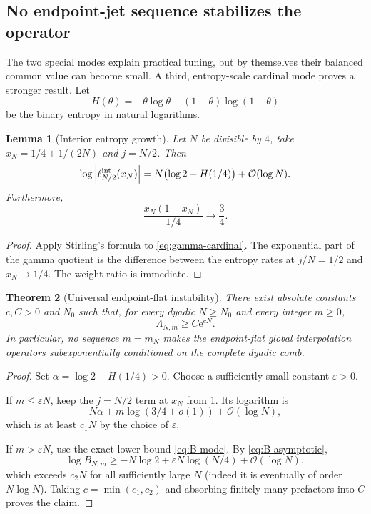 \documentclass[11pt,oneside]{article}
\numberwithin{equation}{section}
\newtheorem{theorem}{Theorem}[section]
\newtheorem{lemma}[theorem]{Lemma}
\theoremstyle{definition}
\theoremstyle{remark}
\newcommand{\e}{\mathrm e}
\newcommand{\bigO}{\mathcal O}
\newcommand{\Leb}{\Lambda}
\newcommand{\Hbin}{H}
\begin{document}
\subsection{No endpoint-jet sequence stabilizes the operator}

The two special modes explain practical tuning, but by themselves their balanced common
value can become small.  A third, entropy-scale cardinal mode proves a stronger result.
Let
\begin{equation}
 \Hbin(\theta)=-\theta\log\theta-(1-\theta)\log(1-\theta)
\end{equation}
be the binary entropy in natural logarithms.

\begin{lemma}[Interior entropy growth]
\label{lem:entropy-cardinal}
Let $N$ be divisible by $4$, take
$x_N=1/4+1/(2N)$ and $j=N/2$.  Then
\begin{equation}
 \log\left|\ell_{N/2}^{\rm int}(x_N)\right|
 =N\bigl(\log2-\Hbin(1/4)\bigr)+\bigO(\log N).
 \label{eq:entropy-growth}
\end{equation}
Furthermore,
\begin{equation}
 \frac{x_N(1-x_N)}{1/4}\longrightarrow\frac34.
 \label{eq:entropy-weight}
\end{equation}
\end{lemma}

\begin{proof}
Apply Stirling's formula to \eqref{eq:gamma-cardinal}.  The exponential part of the gamma
quotient is the difference between the entropy rates at $j/N=1/2$ and $x_N\to1/4$.
The weight ratio is immediate.
\end{proof}

\begin{theorem}[Universal endpoint-flat instability]
\label{thm:universal-instability}
There exist absolute constants $c,C>0$ and $N_0$ such that, for every dyadic
$N\ge N_0$ and every integer $m\ge0$,
\begin{equation}
 \Leb_{N,m}\ge C\e^{cN}.
 \label{eq:universal-instability}
\end{equation}
In particular, no sequence $m=m_N$ makes the endpoint-flat global interpolation operators
subexponentially conditioned on the complete dyadic comb.
\end{theorem}

\begin{proof}
Set $\alpha=\log2-\Hbin(1/4)>0$.  Choose a sufficiently small constant
$\varepsilon>0$.

If $m\le\varepsilon N$, keep the $j=N/2$ term at $x_N$ from
\cref{lem:entropy-cardinal}.  Its logarithm is
\[
 N\alpha+m\log(3/4+o(1))+\bigO(\log N),
\]
which is at least $c_1N$ by the choice of $\varepsilon$.

If $m>\varepsilon N$, use the exact lower bound \eqref{eq:B-mode}.  By
\eqref{eq:B-asymptotic},
\[
 \log B_{N,m}
 \ge -N\log2+\varepsilon N\log(N/4)+\bigO(\log N),
\]
which exceeds $c_2N$ for all sufficiently large $N$ (indeed it is eventually of order
$N\log N$).  Taking $c=\min(c_1,c_2)$ and absorbing finitely many prefactors into $C$
proves the claim.
\end{proof}
\end{document}
